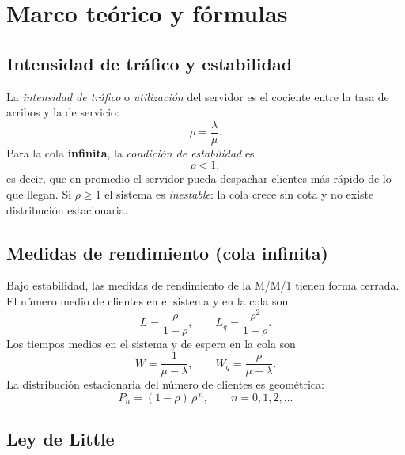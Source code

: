 \documentclass[11pt]{article}
\begin{document}


\section{Marco te\'orico y f\'ormulas}

\subsection{Intensidad de tr\'afico y estabilidad}

La \emph{intensidad de tr\'afico} o \emph{utilizaci\'on} del servidor es el
cociente entre la tasa de arribos y la de servicio:
\begin{equation}
\rho = \frac{\lambda}{\mu}.
\end{equation}
Para la cola \textbf{infinita}, la \emph{condici\'on de estabilidad} es
\begin{equation}
\rho < 1,
\end{equation}
es decir, que en promedio el servidor pueda despachar clientes m\'as r\'apido
de lo que llegan. Si $\rho \ge 1$ el sistema es \emph{inestable}: la cola
crece sin cota y no existe distribuci\'on estacionaria.

\subsection{Medidas de rendimiento (cola infinita)}

Bajo estabilidad, las medidas de rendimiento de la M/M/1 tienen forma
cerrada. El n\'umero medio de clientes en el sistema y en la cola son
\begin{equation}
L = \frac{\rho}{1-\rho},
\qquad
L_q = \frac{\rho^2}{1-\rho}.
\end{equation}
Los tiempos medios en el sistema y de espera en la cola son
\begin{equation}
W = \frac{1}{\mu-\lambda},
\qquad
W_q = \frac{\rho}{\mu-\lambda}.
\end{equation}
La distribuci\'on estacionaria del n\'umero de clientes es geom\'etrica:
\begin{equation}
P_n = (1-\rho)\,\rho^{\,n},
\qquad n = 0, 1, 2, \dots
\end{equation}

\subsection{Ley de Little}
\end{document}
